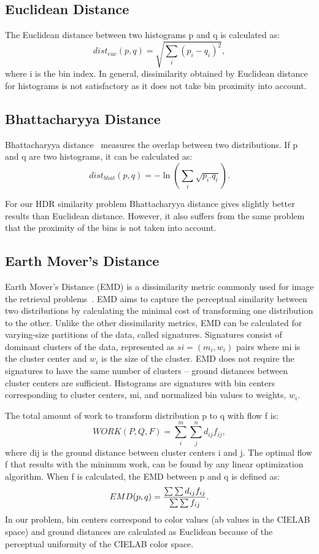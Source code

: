 \subsection{Euclidean Distance}
The Euclidean distance between two histograms p and q is calculated as:
\begin{equation}
dist_{euc}(p,q) = \sqrt{\sum_i(p_i-q_i)^2},
\end{equation}
where i is the bin index. In general, dissimilarity obtained by Euclidean distance for histograms is not satisfactory as it does not take bin proximity into account.
\subsection{Bhattacharyya Distance}
Bhattacharyya distance~\cite{bhattacharyya1946measure} measures the overlap between two distributions. If p and q are two histograms, it can be calculated as:
\begin{equation}
dist_{bhat}(p,q) = -\ln \left( \sum_i \sqrt{p_i.q_i} \right).
\end{equation}

For our HDR similarity problem Bhattacharyya distance gives slightly better results than Euclidean distance. However, it also suffers from the same problem that the proximity of the bins is not taken into account.
\subsection{Earth Mover’s Distance}
Earth Mover’s Distance (EMD) is a dissimilarity metric commonly used for image the retrieval problems~\cite{rubner2000earth}. EMD aims to capture the perceptual similarity between two distributions by calculating the minimal cost of transforming one distribution to the other. Unlike the other dissimilarity metrics, EMD can be calculated for varying-size partitions of the data, called signatures.
Signatures consist of dominant clusters of the data, represented as $si = (m_i, w_i)$ pairs where mi is the cluster center and $w_i$ is the size of the cluster. EMD does not require the signatures to have the same number of clusters – ground distances between cluster centers are sufficient. Histograms are signatures with bin centers corresponding to cluster centers, mi, and normalized bin values to weights, $w_i$.

The total amount of work to transform distribution
p to q with flow f is:
\begin{equation}
WORK(P,Q,F) = \sum_i^m \sum_j^n d_{ij}f_{ij}, 
\end{equation}
where dij is the ground distance between cluster centers i and j. The optimal flow f that results with the minimum work, can be found by any linear optimization algorithm. When f is calculated, the EMD between p and q is defined as:
\begin{equation}
EMD(p,q) = {{\sum \sum d_{ij}f_{ij}}\over{\sum \sum f_{ij}}}.
\end{equation}
In our problem, bin centers correspond to color values
(ab values in the CIELAB space) and ground distances
are calculated as Euclidean because of the perceptual
uniformity of the CIELAB color space.


